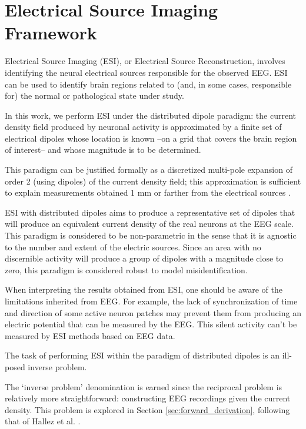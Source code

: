 \section{Electrical Source Imaging Framework}

Electrical Source Imaging (ESI), or Electrical Source Reconstruction, involves identifying the neural electrical sources responsible for the observed EEG.
%
ESI can be used to identify brain regions related to (and, in some cases, responsible for) the normal or pathological state under study.

%
In this work, we perform ESI under the distributed dipole paradigm: the current density field produced by neuronal activity is approximated by a finite set of electrical dipoles whose location is known --on a grid that covers the brain region of interest-- and whose magnitude is to be determined. 

This paradigm can be justified formally as a discretized multi-pole expansion of order 2 (using dipoles) of the current density field; this approximation is sufficient to explain measurements obtained 1 mm or farther from the electrical sources \cite{nunez2019multi}.

ESI with distributed dipoles aims to produce a representative set of dipoles that will produce an equivalent current density of the real neurons at the EEG scale.
%
This paradigm is considered to be non-parametric in the sense that it is agnostic to the number and extent of the electric sources. 
%
Since an area with no discernible activity will produce a group of dipoles with a magnitude close to zero, this paradigm is considered robust to model misidentification.

When interpreting the results obtained from ESI, one should be aware of the limitations inherited from EEG.
%
For example, the lack of synchronization of time and direction of some active neuron patches may prevent them from producing an electric potential that can be measured by the EEG.
%
This silent activity can't be measured by ESI methods based on EEG data.

The task of performing ESI within the paradigm of distributed dipoles is an ill-posed inverse problem.

The `inverse problem' denomination is earned since the reciprocal problem is relatively more straightforward: constructing EEG recordings given the current density.
%
This problem is explored in Section \ref{sec:forward_derivation}, following that of Hallez et al. \cite{hallez2007review}.

